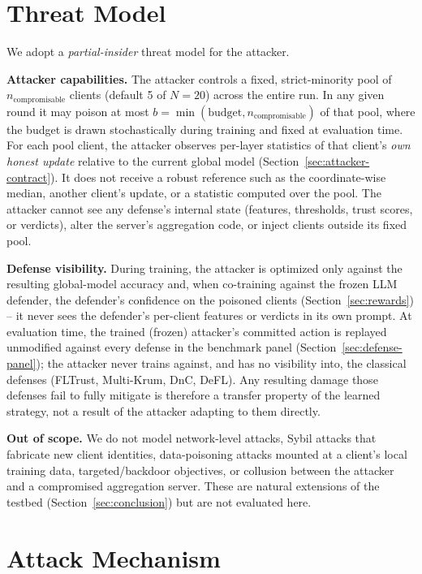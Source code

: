 \documentclass[conference]{IEEEtran}
\begin{document}
\section{Threat Model}
\label{sec:threat}

We adopt a \emph{partial-insider} threat model for the attacker.

\textbf{Attacker capabilities.} The attacker controls a fixed, strict-minority pool of $n_{\mathrm{compromisable}}$ clients (default 5 of $N=20$) across the entire run. In any given round it may poison at most $b=\min(\text{budget}, n_{\mathrm{compromisable}})$ of that pool, where the budget is drawn stochastically during training and fixed at evaluation time. For each pool client, the attacker observes per-layer statistics of that client's \emph{own honest update} relative to the current global model (Section~\ref{sec:attacker-contract}). It does not receive a robust reference such as the coordinate-wise median, another client's update, or a statistic computed over the pool. The attacker cannot see any defense's internal state (features, thresholds, trust scores, or verdicts), alter the server's aggregation code, or inject clients outside its fixed pool.

\textbf{Defense visibility.} During training, the attacker is optimized only against the resulting global-model accuracy and, when co-training against the frozen LLM defender, the defender's confidence on the poisoned clients (Section~\ref{sec:rewards}) -- it never sees the defender's per-client features or verdicts in its own prompt. At evaluation time, the trained (frozen) attacker's committed action is replayed unmodified against every defense in the benchmark panel (Section~\ref{sec:defense-panel}); the attacker never trains against, and has no visibility into, the classical defenses (FLTrust, Multi-Krum, DnC, DeFL). Any resulting damage those defenses fail to fully mitigate is therefore a transfer property of the learned strategy, not a result of the attacker adapting to them directly.

\textbf{Out of scope.} We do not model network-level attacks, Sybil attacks that fabricate new client identities, data-poisoning attacks mounted at a client's local training data, targeted/backdoor objectives, or collusion between the attacker and a compromised aggregation server. These are natural extensions of the testbed (Section~\ref{sec:conclusion}) but are not evaluated here.

\section{Attack Mechanism}
\label{sec:attack}
\end{document}
